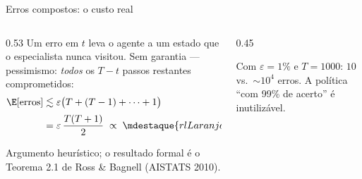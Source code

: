 \documentclass[aspectratio=169, 11pt]{beamer}
\begin{document}
\begin{frame}{Erros compostos: o custo real}

  \begin{columns}[T]
  \begin{column}{0.53\textwidth}
    Um erro em $t$ leva o agente a um estado que o especialista nunca visitou.
    Sem garantia --- pessimismo: \emph{todos} os $T-t$ passos restantes
    comprometidos:
    \begin{align*}
      \E[\text{erros}] &\lesssim
        \varepsilon\bigl(T + (T-1) + \dots + 1\bigr)\\[0.2em]
        &= \varepsilon\,\frac{T(T+1)}{2}
        \;\propto\; \mdestaque{rlLaranja}{\varepsilon\,T^{2}}
    \end{align*}

    \smallskip
    {\scriptsize\color{rlCinza} Argumento heurístico; o resultado formal é o
    Teorema 2.1 de Ross \& Bagnell (AISTATS 2010).}
  \end{column}
  \begin{column}{0.45\textwidth}
    \begin{center}
    \end{center}
    \begin{alertabox}
      Com $\varepsilon = 1\%$ e $T = 1000$: $10$ vs.\ $\sim\!10^{4}$ erros. A
      política ``com 99\% de acerto'' é inutilizável.
    \end{alertabox}
  \end{column}
  \end{columns}
\end{frame}
\end{document}
